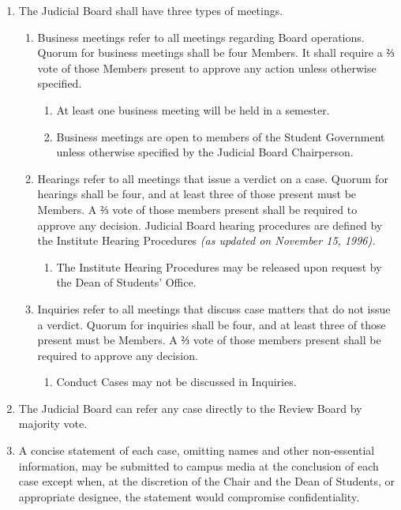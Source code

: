 \begin{enumerate}
  \item The Judicial Board shall have three types of meetings.
  \begin{enumerate}
    \item Business meetings refer to all meetings regarding Board operations. Quorum for business meetings shall be four Members. It shall require a ⅔ vote of those Members present to approve any action unless otherwise specified.
      \begin{enumerate}
        \item At least one business meeting will be held in a semester.
        \item Business meetings are open to members of the Student Government unless otherwise specified by the Judicial Board Chairperson.
      \end{enumerate}
    \item Hearings refer to all meetings that issue a verdict on a case. Quorum for hearings shall be four, and at least three of those present must be Members. A ⅔ vote of those members present shall be required to approve any decision. Judicial Board hearing procedures are defined by the Institute Hearing Procedures \textit{(as updated on November 15, 1996).}
      \begin{enumerate}
        \item The Institute Hearing Procedures may be released upon request by the Dean of Students' Office.
      \end{enumerate}
    \item Inquiries refer to all meetings that discuss case matters that do not issue a verdict. Quorum for inquiries shall be four, and at least three of those present must be Members. A ⅔ vote of those members present shall be required to approve any decision.
      \begin{enumerate}
        \item Conduct Cases may not be discussed in Inquiries.
      \end{enumerate}
  \end{enumerate}
  \item The Judicial Board can refer any case directly to the Review Board by majority vote.
  \item A concise statement of each case, omitting names and other non-essential information, may be submitted to campus media at the conclusion of each case except when, at the discretion of the Chair and the Dean of Students, or appropriate designee, the statement would compromise confidentiality.
\end{enumerate}


